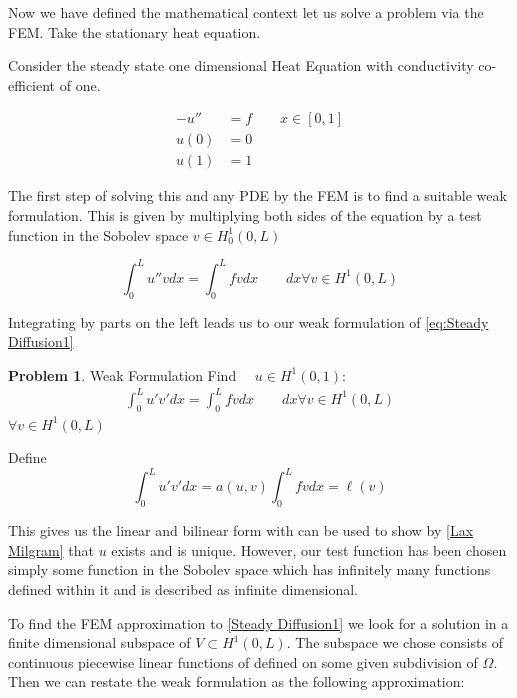 \documentclass{uonmathreport}
\theoremstyle{definition}
\theoremstyle{problem}
\newtheorem{problem}{Problem}[section]
\theoremstyle{theorem}
\begin{document}
Now we have defined the mathematical context let us solve a problem via the FEM. Take the stationary heat equation.

Consider the steady state one dimensional Heat Equation with conductivity co-efficient of one. 



\begin{subequations} 
\label{eq:Steady Diffusion1} 
\begin{align}
-u'' &= f		\quad \quad  x \in [0, 1] \\  	
u(0) &= 0 \\
u(1) &= 1
\end{align}
\end{subequations}

The first step of solving this and any PDE by the FEM is to find a suitable weak formulation. This is given by multiplying both sides of the equation by a test function in the Sobolev space $v \in H^1_0(0, L)$

\begin{equation*}
\int_0^L  u'' v  dx = \int_0^L  f v dx 	\quad \quad  dx \forall v \in H^1(0, L)
\end{equation*}

Integrating by parts on the left leads us to our weak formulation of \ref{eq:Steady Diffusion1}

\begin{problem}{Weak Formulation} \label{prob:Weak Formulation Elliptic}
Find $\quad u \in H^1(0, 1)$:
\begin{align*}
\int_0^L  u' v'  dx =   \int_0^L  f v dx  \quad \quad  dx \forall v \in H^1(0, L)
\end{align*}
$\forall v \in H^1(0, L)$
\end{problem}

Define 
\begin{equation*}
\int_0^L  u' v'  dx = a(u, v)  	
\int_0^L  f v dx  =  \ell(v)
\end{equation*}

This gives us the linear and bilinear form with can be used to show by \ref{Lax Milgram} that $u$ exists and is unique. However, our test function has been chosen simply some function in the Sobolev space which has infinitely many functions defined within it and is described as infinite dimensional. 

To find the FEM approximation to \ref{Steady Diffusion1} we look for a solution in a finite dimensional subspace of $V\subset H^1(0, L) $. The subspace we chose consists of continuous piecewise linear functions of defined on some given subdivision of $\Omega$. Then we can restate the weak formulation as the following approximation:
\end{document}
